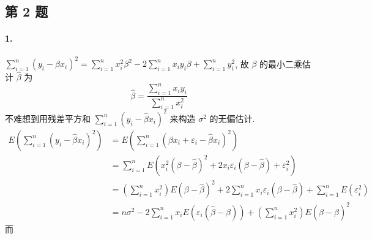 \documentclass[\ROOT/main.tex]{subfiles}
\begin{document}
\subsection{第 2 题}
\noindent\paragraph*{1.}
$\sum_{i = 1}^{n} \left( y_i - \beta x_i \right)^2 = \sum_{i = 1}^{n} x_i^2 \beta^2 - 2 \sum_{i = 1}^{n} x_i y_i \beta + \sum_{i = 1}^{n} y_i^2$,
故 $\beta$ 的最小二乘估计 $\widehat{\beta}$ 为
\[
    \widehat{\beta} = \frac{\sum_{i = 1}^{n} x_i y_i}{\sum_{i = 1}^{n} x_i^2}
\]
不难想到用残差平方和 $\sum_{i = 1}^{n} ( y_i - \widehat{\beta} x_i )^2$ 来构造 $\sigma^2$ 的无偏估计.
\begin{align*}
    E \left( \sum_{i = 1}^{n} ( y_i - \widehat{\beta} x_i )^2 \right)
    &= E \left( \sum_{i = 1}^{n} \left( \beta x_i + \varepsilon_i - \widehat{\beta} x_i \right)^2 \right) \\
    &= \sum_{i = 1}^{n} E \left( x_i^2 ( \beta - \widehat{\beta} )^2 + 2 x_i \varepsilon_i ( \beta - \widehat{\beta} ) + \varepsilon_i^2 \right) \\
    &= \left( \sum_{i = 1}^{n} x_i^2 \right) E (\beta - \widehat{\beta})^2 + 2 \sum_{i = 1}^{n} x_i \varepsilon_i (\beta - \widehat{\beta}) + \sum_{i = 1}^{n} E \left( \varepsilon_i^2 \right) \\
    &= n \sigma^2 - 2 \sum_{i = 1}^{n} x_i E (\varepsilon_i (\widehat{\beta} - \beta)) + \left( \sum_{i = 1}^{n} x_i^2 \right) E (\widehat{\beta} - \beta)^2
\end{align*}
而
\end{document}
